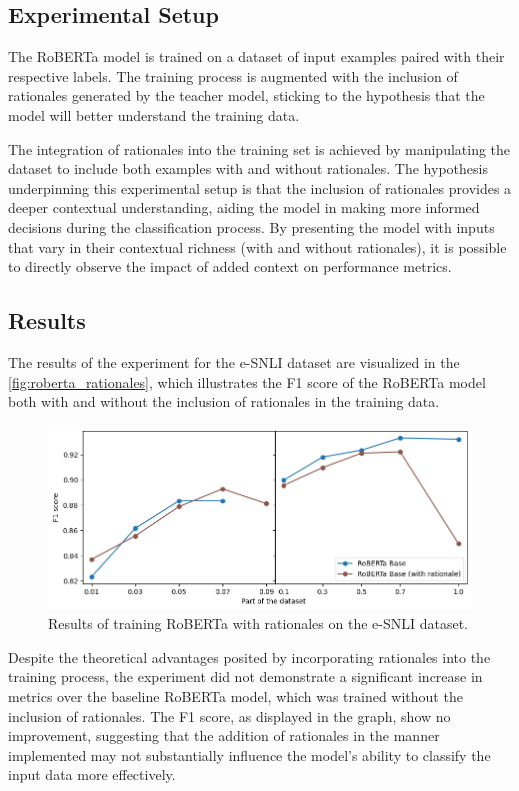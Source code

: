\subsection*{Experimental Setup}

The RoBERTa model is trained on a dataset of input examples paired with their respective labels. The training process is augmented with the inclusion of rationales generated by the teacher model, sticking to the hypothesis that the model will better understand the training data.

The integration of rationales into the training set is achieved by manipulating the dataset to include both examples with and without rationales. The hypothesis underpinning this experimental setup is that the inclusion of rationales provides a deeper contextual understanding, aiding the model in making more informed decisions during the classification process. By presenting the model with inputs that vary in their contextual richness (with and without rationales), it is possible to directly observe the impact of added context on performance metrics.

\subsection*{Results}

The results of the experiment for the e-SNLI dataset are visualized in the \autoref{fig:roberta_rationales}, which illustrates the F1 score of the RoBERTa model both with and without the inclusion of rationales in the training data.

\begin{figure}[hbt]
    \centering
    \includegraphics[width=\linewidth]{figs/roberta_rat.png}
    \caption{Results of training RoBERTa with rationales on the e-SNLI dataset.}
    \label{fig:roberta_rationales}
\end{figure}

Despite the theoretical advantages posited by incorporating rationales into the training process, the experiment did not demonstrate a significant increase in metrics over the baseline RoBERTa model, which was trained without the inclusion of rationales. The F1 score, as displayed in the graph, show no improvement, suggesting that the addition of rationales in the manner implemented may not substantially influence the model's ability to classify the input data more effectively.

